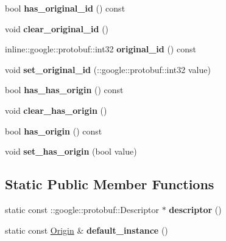 \begin{DoxyCompactItemize}
\item 
\hypertarget{classlattice_1_1Origin_a27d775c4dbd86e55dd6b2bac5f53a194}{
bool {\bfseries has\_\-original\_\-id} () const }
\label{classlattice_1_1Origin_a27d775c4dbd86e55dd6b2bac5f53a194}

\item 
\hypertarget{classlattice_1_1Origin_ae14e0ae4e2b32f4948842a8c64925416}{
void {\bfseries clear\_\-original\_\-id} ()}
\label{classlattice_1_1Origin_ae14e0ae4e2b32f4948842a8c64925416}

\item 
\hypertarget{classlattice_1_1Origin_a0a00308cd28bd4e3836c6a0418276aa5}{
inline::google::protobuf::int32 {\bfseries original\_\-id} () const }
\label{classlattice_1_1Origin_a0a00308cd28bd4e3836c6a0418276aa5}

\item 
\hypertarget{classlattice_1_1Origin_a97ff5372885f733870170f9dfbd3032b}{
void {\bfseries set\_\-original\_\-id} (::google::protobuf::int32 value)}
\label{classlattice_1_1Origin_a97ff5372885f733870170f9dfbd3032b}

\item 
\hypertarget{classlattice_1_1Origin_ad04e2fe74f9c22a83fc22548ade3fd7c}{
bool {\bfseries has\_\-has\_\-origin} () const }
\label{classlattice_1_1Origin_ad04e2fe74f9c22a83fc22548ade3fd7c}

\item 
\hypertarget{classlattice_1_1Origin_ae06e598e03504e3f52a69e1649ef0b84}{
void {\bfseries clear\_\-has\_\-origin} ()}
\label{classlattice_1_1Origin_ae06e598e03504e3f52a69e1649ef0b84}

\item 
\hypertarget{classlattice_1_1Origin_a7b9159f866b74e939a6805a1d765a663}{
bool {\bfseries has\_\-origin} () const }
\label{classlattice_1_1Origin_a7b9159f866b74e939a6805a1d765a663}

\item 
\hypertarget{classlattice_1_1Origin_a7162284423c272a182e8ec697321b97a}{
void {\bfseries set\_\-has\_\-origin} (bool value)}
\label{classlattice_1_1Origin_a7162284423c272a182e8ec697321b97a}

\end{DoxyCompactItemize}
\subsection*{Static Public Member Functions}
\begin{DoxyCompactItemize}
\item 
\hypertarget{classlattice_1_1Origin_aef7714cc60835e8c713096a534ad1d03}{
static const ::google::protobuf::Descriptor $\ast$ {\bfseries descriptor} ()}
\label{classlattice_1_1Origin_aef7714cc60835e8c713096a534ad1d03}

\item 
\hypertarget{classlattice_1_1Origin_a0b2ab113218d71f92d6fda3a8b6c51bc}{
static const \hyperlink{classlattice_1_1Origin}{Origin} \& {\bfseries default\_\-instance} ()}
\label{classlattice_1_1Origin_a0b2ab113218d71f92d6fda3a8b6c51bc}

\end{DoxyCompactItemize}
